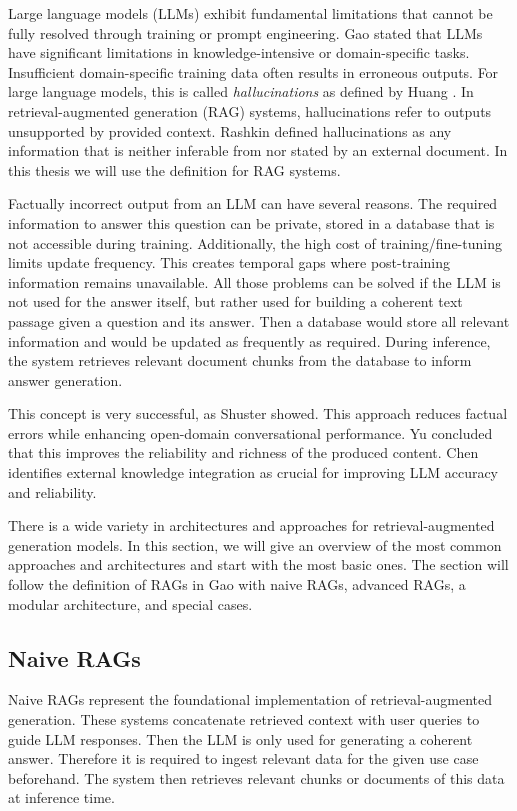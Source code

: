 Large language models (LLMs) exhibit fundamental limitations that cannot be fully resolved through training or prompt engineering. Gao \cite{Gao.18.12.2023} stated that LLMs have significant limitations in knowledge-intensive or domain-specific tasks. Insufficient domain-specific training data often results in erroneous outputs. For large language models, this is called \textit{hallucinations} as defined by Huang \cite{Huang.2023}. In retrieval-augmented generation (RAG) systems, hallucinations refer to outputs unsupported by provided context. Rashkin \cite{Rashkin.} defined hallucinations as any information that is neither inferable from nor stated by an external document. In this thesis we will use the definition for RAG systems.

Factually incorrect output from an LLM can have several reasons. The required information to answer this question can be private, stored in a database that is not accessible during training. Additionally, the high cost of training/fine-tuning limits update frequency. This creates temporal gaps where post-training information remains unavailable. All those problems can be solved if the LLM is not used for the answer itself, but rather used for building a coherent text passage given a question and its answer. Then a database would store all relevant information and would be updated as frequently as required. During inference, the system retrieves relevant document chunks from the database to inform answer generation.

This concept is very successful, as Shuster \cite{Shuster.} showed. This approach reduces factual errors while enhancing open-domain conversational performance. Yu \cite{Yu.2024} concluded that this improves the reliability and richness of the produced content. Chen \cite{Chen.2024} identifies external knowledge integration as crucial for improving LLM accuracy and reliability.

There is a wide variety in architectures and approaches for retrieval-augmented generation models. In this section, we will give an overview of the most common approaches and architectures and start with the most basic ones. The section will follow the definition of RAGs in Gao \cite{Gao.18.12.2023} with naive RAGs, advanced RAGs, a modular architecture, and special cases.

\subsection{Naive RAGs}
\label{sec:naive_rags}
Naive RAGs represent the foundational implementation of retrieval-augmented generation. These systems concatenate retrieved context with user queries to guide LLM responses. Then the LLM is only used for generating a coherent answer. Therefore it is required to ingest relevant data for the given use case beforehand. The system then retrieves relevant chunks or documents of this data at inference time. 


